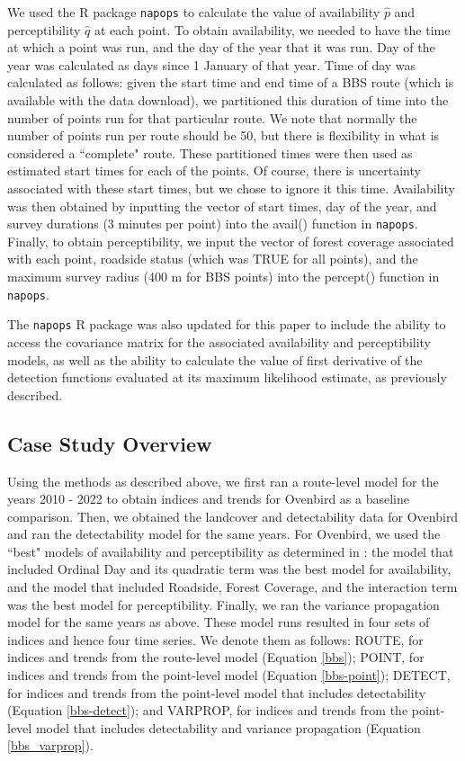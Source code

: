 \documentclass[12pt]{article}
\begin{document}
\par We used the R package \texttt{napops} \citep{edwards_napops_2024} to calculate the value of availability $\hat{p}$ and perceptibility $\hat{q}$ at each point.
To obtain availability, we needed to have the time at which a point was run, and the day of the year that it was run.
Day of the year was calculated as days since 1 January of that year.
Time of day was calculated as follows: given the start time and end time of a BBS route (which is available with the data download), we partitioned this duration of time into the number of points run for that particular route.
We note that normally the number of points run per route should be 50, but there is flexibility in what is considered a ``complete" route.
These partitioned times were then used as estimated start times for each of the points. 
Of course, there is uncertainty associated with these start times, but we chose to ignore it this time.
Availability was then obtained by inputting the vector of start times, day of the year, and survey durations (3 minutes per point) into the avail() function in \texttt{napops}.
Finally, to obtain perceptibility, we input the vector of forest coverage associated with each point, roadside status (which was TRUE for all points), and the maximum survey radius (400 m for BBS points) into the percept() function in \texttt{napops}.

\par The \texttt{napops} R package was also updated for this paper to include the ability to access the covariance matrix for the associated availability and perceptibility models, as well as the ability to calculate the value of first derivative of the detection functions evaluated at its maximum likelihood estimate, as previously described.

\subsection{Case Study Overview}

Using the methods as described above, we first ran a route-level model for the years 2010 - 2022 to obtain indices and trends for Ovenbird as a baseline comparison.
Then, we obtained the landcover and detectability data for Ovenbird and ran the detectability model for the same years.
For Ovenbird, we used the ``best" models of availability and perceptibility as determined in \citet{edwards_point_2023}: the model that included Ordinal Day and its quadratic term was the best model for availability, and the model that included Roadside, Forest Coverage, and the interaction term was the best model for perceptibility.
Finally, we ran the variance propagation model for the same years as above.
These model runs resulted in four sets of indices and hence four time series.
We denote them as follows: ROUTE, for indices and trends from the route-level model (Equation \ref{bbs}); POINT, for indices and trends from the point-level model (Equation \ref{bbs-point}); DETECT, for indices and trends from the point-level model that includes detectability (Equation \ref{bbs-detect}); and VARPROP, for indices and trends from the point-level model that includes detectability and variance propagation (Equation \ref{bbs_varprop}).
\end{document}
